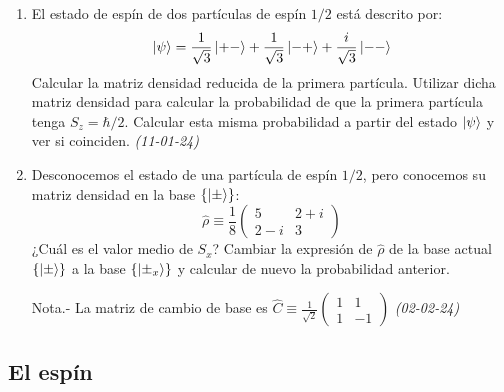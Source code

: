 \begin{enumerate}
    \item El estado de espín de dos partículas de espín $1/2$ está descrito por:
    \[
    \ket{\psi} = \frac{1}{\sqrt{3}} \ket{+-} + \frac{1}{\sqrt{3}} \ket{-+} + \frac{i}{\sqrt{3}} \ket{--}
    \]
    Calcular la matriz densidad reducida de la primera partícula. Utilizar dicha matriz densidad para calcular la probabilidad de que la primera partícula tenga $S_z = \hbar/2$. Calcular esta misma probabilidad a partir del estado $\ket{\psi}$ y ver si coinciden. \textit{(11-01-24)}

    \item Desconocemos el estado de una partícula de espín $1/2$, pero conocemos su matriz densidad en la base $\{\ket{\pm}\}$:
    \[
    \hat{\rho} \equiv \frac{1}{8} \begin{pmatrix} 5 & 2 + i \\ 2 - i & 3 \end{pmatrix}
    \]
    ¿Cuál es el valor medio de $S_x$? Cambiar la expresión de $\hat{\rho}$ de la base actual $\{\ket{\pm}\}$ a la base $\{\ket{\pm _x}\}$ y calcular de nuevo la probabilidad anterior.

    Nota.- La matriz de cambio de base es $\hat{C} \equiv \frac{1}{\sqrt{2}} \begin{pmatrix} 1 & 1 \\ 1 & -1 \end{pmatrix}$ \textit{(02-02-24)}

\end{enumerate}

\subsection*{El espín}

